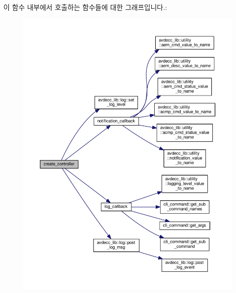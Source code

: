 이 함수 내부에서 호출하는 함수들에 대한 그래프입니다.\+:
\nopagebreak
\begin{figure}[H]
\begin{center}
\leavevmode
\includegraphics[width=350pt]{namespaceavdecc__lib_a4916fb5f28d3347dbe215b599e217354_cgraph}
\end{center}
\end{figure}


